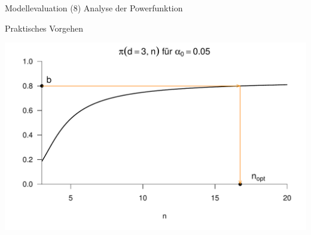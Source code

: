 \documentclass[
  8pt,
  ignorenonframetext,
]{beamer}
\begin{document}
\begin{frame}{Modellevaluation}
\protect\hypertarget{modellevaluation-38}{}
\noindent (8) Analyse der Powerfunktion

\small

Praktisches Vorgehen \vspace{5mm}

\begin{center}\includegraphics[width=0.8\linewidth]{9_Abbildungen/alm_9_t_test_zweistichproben_umfang} \end{center}
\end{frame}
\end{document}
